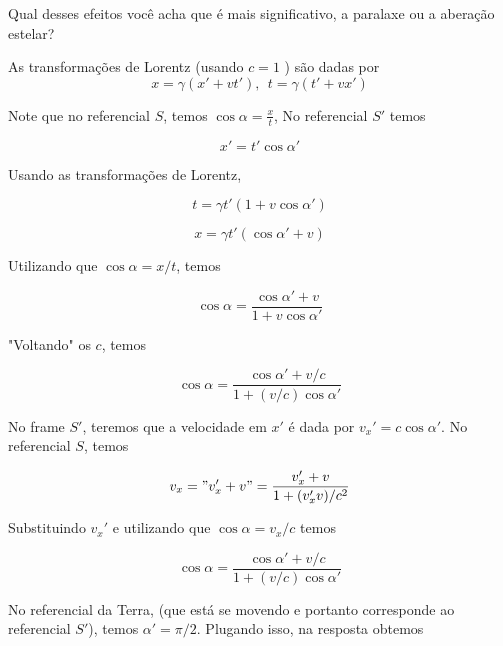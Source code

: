 \documentclass[11pt]{article}
\begin{document}
\begin{pproblem}
\begin{alternativas}
        \item Qual desses efeitos você acha que é mais significativo, a paralaxe ou a aberação estelar?
    \end{alternativas}

    \begin{pssolution*}{}{}
        \begin{alternativas}
            \item %
            
            \item %
                
            \item As transformações de Lorentz (usando \(c=1\) ) são dadas por 
            \[x = \gamma (x' + vt'), \ \ t = \gamma(t' + vx')\]

            \item Note que no referencial \(S\), temos \(\cos \alpha = \frac{x}{t}\), No referencial \(S'\) temos 
            
            \[x' = t'\cos\alpha'\]

            Usando as transformações de Lorentz, 

            \[t = \gamma t'(1+v\cos\alpha') \]

            \[x = \gamma t'(\cos\alpha'+ v)\]

            Utilizando que \(\cos\alpha = x/t\), temos

            \[\cos\alpha = \frac{\cos\alpha' + v}{1+ v\cos\alpha'}\]

            "Voltando" os \(c\), temos

            \[\boxed{\cos\alpha = \frac{\cos\alpha' + v/c}{1+(v/c)\cos\alpha'}}\]


            \item No frame \(S'\), teremos que a velocidade em \(x'\) é dada por \(v_x' = c\cos\alpha'\). No referencial \(S\), temos
            
            \[v_x = "v_x'+v" = \frac{v_x'+v}{1+(v_x'v)/c^2}\]

            Substituindo \(v_x'\) e utilizando que \(\cos\alpha = v_x/c\) temos

            \[\boxed{\cos\alpha =\frac{\cos\alpha' + v/c}{1+(v/c)\cos\alpha'}} \]

            \item No referencial da Terra, (que está se movendo e portanto corresponde ao referencial \(S'\)), temos \(\alpha' = \pi/2\). Plugando isso, na resposta obtemos
            

\end{alternativas}
\end{pssolution*}
\end{pproblem}
\end{document}
